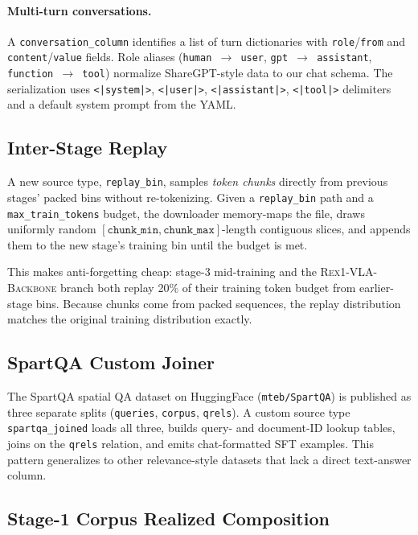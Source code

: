 \documentclass[11pt,a4paper]{article}
\begin{document}
\paragraph{Multi-turn conversations.}
A \texttt{conversation\_column} identifies a list of turn dictionaries with
\texttt{role}/\texttt{from} and \texttt{content}/\texttt{value} fields.
Role aliases (\texttt{human $\to$ user}, \texttt{gpt $\to$ assistant},
\texttt{function $\to$ tool}) normalize ShareGPT-style data to our chat
schema. The serialization uses \texttt{<|system|>}, \texttt{<|user|>},
\texttt{<|assistant|>}, \texttt{<|tool|>} delimiters and a default system
prompt from the YAML.

\subsection{Inter-Stage Replay}

A new source type, \texttt{replay\_bin}, samples \emph{token chunks}
directly from previous stages' packed bins without re-tokenizing. Given a
\texttt{replay\_bin} path and a \texttt{max\_train\_tokens} budget, the
downloader memory-maps the file, draws uniformly random
$[\texttt{chunk\_min}, \texttt{chunk\_max}]$-length contiguous slices, and
appends them to the new stage's training bin until the budget is met.

This makes anti-forgetting cheap: stage-3 mid-training and the
\textsc{Rex1-VLA-Backbone} branch both replay 20\% of their training token
budget from earlier-stage bins. Because chunks come from packed sequences,
the replay distribution matches the original training distribution exactly.

\subsection{SpartQA Custom Joiner}

The SpartQA spatial QA dataset on HuggingFace
(\texttt{mteb/SpartQA}) is published as three separate splits
(\texttt{queries}, \texttt{corpus}, \texttt{qrels}). A custom source type
\texttt{spartqa\_joined} loads all three, builds query- and document-ID
lookup tables, joins on the \texttt{qrels} relation, and emits chat-formatted
SFT examples. This pattern generalizes to other relevance-style datasets
that lack a direct text-answer column.

\subsection{Stage-1 Corpus Realized Composition}
\end{document}

